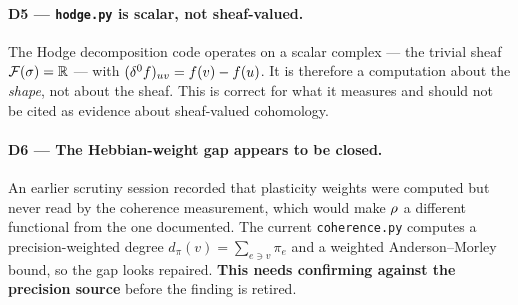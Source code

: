 \paragraph{D5 --- \texttt{hodge.py} is scalar, not sheaf-valued.}
The Hodge decomposition code operates on a scalar complex --- the
trivial sheaf $\mathcal{F}(\sigma)=\mathbb{R}$ --- with
$(\delta^0 f)_{uv}=f(v)-f(u)$. It is therefore a computation about the
\emph{shape}, not about the sheaf. This is correct for what it measures
and should not be cited as evidence about sheaf-valued cohomology.

\paragraph{D6 --- The Hebbian-weight gap appears to be closed.}
An earlier scrutiny session recorded that plasticity weights were
computed but never read by the coherence measurement, which would make
$\rho$ a different functional from the one documented. The current
\texttt{coherence.py} computes a precision-weighted degree
$d_\pi(v)=\sum_{e\ni v}\pi_e$ and a weighted Anderson--Morley bound, so
the gap looks repaired. \textbf{This needs confirming against the
precision source} before the finding is retired.
